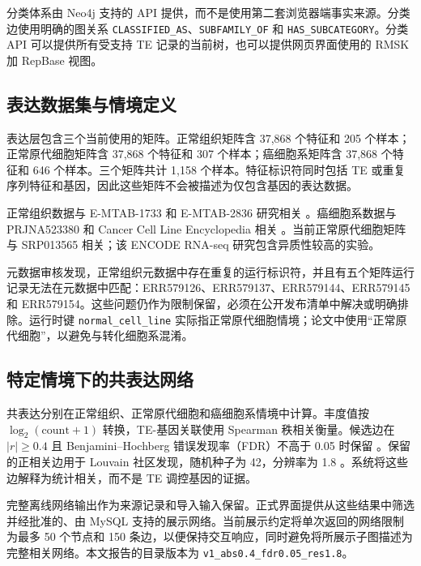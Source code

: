 分类体系由 Neo4j 支持的 API 提供，而不是使用第二套浏览器端事实来源。分类边使用明确的图关系 \texttt{CLASSIFIED\_AS}、\texttt{SUBFAMILY\_OF} 和 \texttt{HAS\_SUBCATEGORY}。分类 API 可以提供所有受支持 TE 记录的当前树，也可以提供网页界面使用的 RMSK 加 RepBase 视图。

\subsection{表达数据集与情境定义}

表达层包含三个当前使用的矩阵。正常组织矩阵含 37,868 个特征和 205 个样本；正常原代细胞矩阵含 37,868 个特征和 307 个样本；癌细胞系矩阵含 37,868 个特征和 646 个样本。三个矩阵共计 1,158 个样本。特征标识符同时包括 TE 或重复序列特征和基因，因此这些矩阵不会被描述为仅包含基因的表达数据。

正常组织数据与 E-MTAB-1733 和 E-MTAB-2836 研究相关 \citep{Edqvist2015SkinTranscriptome,Uhlen2015HumanProteome}。癌细胞系数据与 PRJNA523380 和 Cancer Cell Line Encyclopedia 相关 \citep{Ghandi2019CCLE}。当前正常原代细胞矩阵与 SRP013565 相关；该 ENCODE RNA-seq 研究包含异质性较高的实验。

元数据审核发现，正常组织元数据中存在重复的运行标识符，并且有五个矩阵运行记录无法在元数据中匹配：ERR579126、ERR579137、ERR579144、ERR579145 和 ERR579154。这些问题仍作为限制保留，必须在公开发布清单中解决或明确排除。运行时键 \texttt{normal\_cell\_line} 实际指正常原代细胞情境；论文中使用“正常原代细胞”，以避免与转化细胞系混淆。

\subsection{特定情境下的共表达网络}

共表达分别在正常组织、正常原代细胞和癌细胞系情境中计算。丰度值按 $\log_{2}(\mathrm{count}+1)$ 转换，TE-基因关联使用 Spearman 秩相关衡量。候选边在 $|r| \geq 0.4$ 且 Benjamini--Hochberg 错误发现率（FDR）不高于 0.05 时保留 \citep{Benjamini1995FDR}。保留的正相关边用于 Louvain 社区发现，随机种子为 42，分辨率为 1.8 \citep{Blondel2008Louvain}。系统将这些边解释为统计相关，而不是 TE 调控基因的证据。

完整离线网络输出作为来源记录和导入输入保留。正式界面提供从这些结果中筛选并经批准的、由 MySQL 支持的展示网络。当前展示约定将单次返回的网络限制为最多 50 个节点和 150 条边，以便保持交互响应，同时避免将所展示子图描述为完整相关网络。本文报告的目录版本为 \texttt{v1\_abs0.4\_fdr0.05\_res1.8}。

